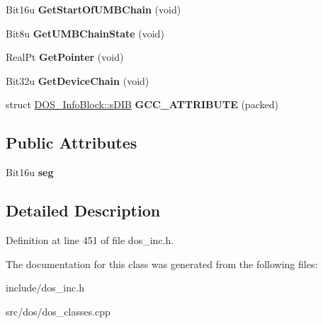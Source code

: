 \begin{DoxyCompactItemize}
\item 
\hypertarget{classDOS__InfoBlock_adb819f949bb84a57ec47b3eadcf8394b}{Bit16u {\bfseries Get\-Start\-Of\-U\-M\-B\-Chain} (void)}\label{classDOS__InfoBlock_adb819f949bb84a57ec47b3eadcf8394b}

\item 
\hypertarget{classDOS__InfoBlock_a77f19be942b10a316e54464547cfb2e2}{Bit8u {\bfseries Get\-U\-M\-B\-Chain\-State} (void)}\label{classDOS__InfoBlock_a77f19be942b10a316e54464547cfb2e2}

\item 
\hypertarget{classDOS__InfoBlock_a872b7fd95a7af22e303971abffc41e86}{Real\-Pt {\bfseries Get\-Pointer} (void)}\label{classDOS__InfoBlock_a872b7fd95a7af22e303971abffc41e86}

\item 
\hypertarget{classDOS__InfoBlock_a79370f3f9f5a228c2b584b330b912dcc}{Bit32u {\bfseries Get\-Device\-Chain} (void)}\label{classDOS__InfoBlock_a79370f3f9f5a228c2b584b330b912dcc}

\item 
\hypertarget{classDOS__InfoBlock_a492f63514c4bc0a876008bd5dffbefb4}{struct \hyperlink{structDOS__InfoBlock_1_1sDIB}{D\-O\-S\-\_\-\-Info\-Block\-::s\-D\-I\-B} {\bfseries G\-C\-C\-\_\-\-A\-T\-T\-R\-I\-B\-U\-T\-E} (packed)}\label{classDOS__InfoBlock_a492f63514c4bc0a876008bd5dffbefb4}

\end{DoxyCompactItemize}
\subsection*{Public Attributes}
\begin{DoxyCompactItemize}
\item 
\hypertarget{classDOS__InfoBlock_ae1079089060526859c4394a55d3153ee}{Bit16u {\bfseries seg}}\label{classDOS__InfoBlock_ae1079089060526859c4394a55d3153ee}

\end{DoxyCompactItemize}


\subsection{Detailed Description}


Definition at line 451 of file dos\-\_\-inc.\-h.



The documentation for this class was generated from the following files\-:\begin{DoxyCompactItemize}
\item 
include/dos\-\_\-inc.\-h\item 
src/dos/dos\-\_\-classes.\-cpp\end{DoxyCompactItemize}
